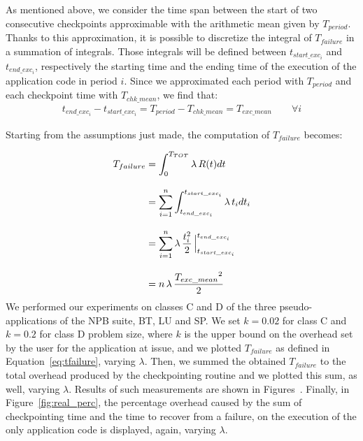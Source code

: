 As mentioned above, we consider the time span between the start of two consecutive checkpoints approximable with the arithmetic mean given by $T_{period}$. Thanks to this approximation, it is possible to discretize the integral of $T_{failure}$ in a summation of integrals. Those integrals will be defined between $t_{start\_exc_i}$ and $t_{end\_exc_i}$, respectively the starting time and the ending time of the execution of the application code in period $i$. Since we approximated each period with $T_{period}$ and each checkpoint time with $T_{chk\_mean}$, we find that:
\begin{align}
    t_{end\_exc_i} - t_{start\_exc_i} = T_{period} - T_{chk\_mean} = T_{exc\_mean}\qquad \forall i 
\end{align}

Starting from the assumptions just made, the computation of $T_{failure}$ becomes:

\begin{align} 
T_{failure} & = \displaystyle\int_0^{T_{TOT}}\lambda\, R(t)dt \\
 \noalign{\vskip9pt}
 & = \sum_{i=1}^n \displaystyle\int_{t_{end\_exc_i}}^{t_{start\_exc_i}}\lambda \,t_idt_i\\
  \noalign{\vskip9pt}
 & = \sum_{i=1}^n\lambda\,\frac{t_i^2}{2}\,\Bigr|_{t_{start\_exc_i}}^{t_{end\_exc_i}}\\
  \noalign{\vskip9pt}
 & = n\, \lambda\,\frac{{T_{exc\_mean}}^2}{2}\label{eq:tfailure}
\end{align}
We performed our experiments on classes C and D of the three pseudo-applications of the NPB suite, BT, LU and SP. We set $k=0.02$ for class C and $k=0.2$ for class D problem size, where $k$ is the upper bound on the overhead set by the user for the application at issue, and we plotted $T_{failure}$ as defined in Equation~\ref{eq:tfailure}, varying $\lambda$. Then, we summed the obtained $T_{failure}$ to the total overhead produced by the checkpointing routine and we plotted this sum, as well, varying $\lambda$. Results of such measurements are shown in Figures~. Finally, in Figure~\ref{fig:real_perc}, the percentage overhead caused by the sum of checkpointing time and the time to recover from a failure, on the execution of the only application code is displayed, again, varying $\lambda$.

